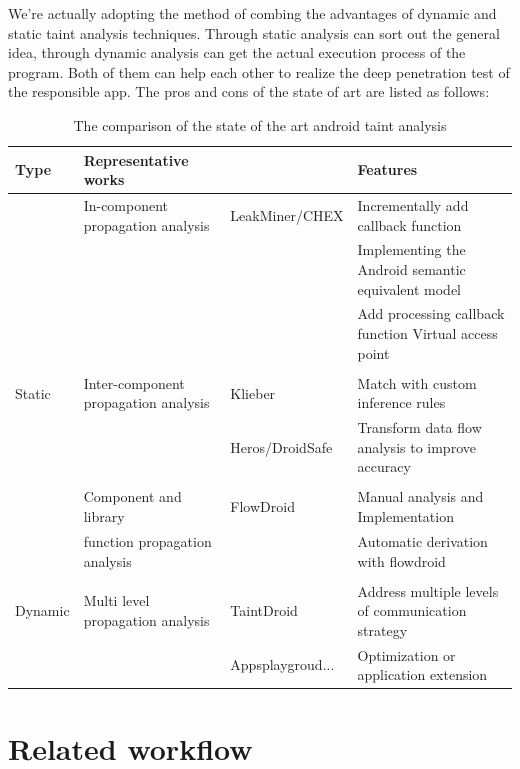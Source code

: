 \documentclass{article}
\begin{document}
We're actually adopting the method of combing the advantages of dynamic and static taint analysis techniques. Through static analysis can sort out the general idea, through dynamic analysis can get the actual execution process of the program. Both of them can help each other to realize the deep penetration test of the responsible app. The pros and cons of the state of art are listed as follows:

\begin{table}
  \caption{The comparison of the state of the art android taint analysis}
   \centering
   \begin{tabular}{llll}
     \toprule
     Type     & Representative works &     & Features \\
     \midrule
           & In-component propagation analysis &LeakMiner/CHEX  & Incrementally add callback function \\
            &                                   &                 &  Implementing the Android semantic equivalent model     \\
            &                                   &                 &  Add processing callback function Virtual access point    \\
      
           &  & &     \\
      Static & Inter-component propagation analysis &Klieber  &Match with custom inference rules    \\
           &  &Heros/DroidSafe & Transform data flow analysis to improve accuracy     \\
           &  & &     \\
           &  Component and library & FlowDroid& Manual analysis and Implementation \\
           & function propagation analysis & &    Automatic derivation with flowdroid   \\
           &  & &     \\
     Dynamic & Multi level propagation analysis&TaintDroid & Address multiple levels of communication strategy      \\
           &   & Appsplaygroud...   & Optimization or application extension  \\
     \bottomrule
   \end{tabular}
   \label{tab:table}
 \end{table}


\section{Related workflow}
\end{document}
